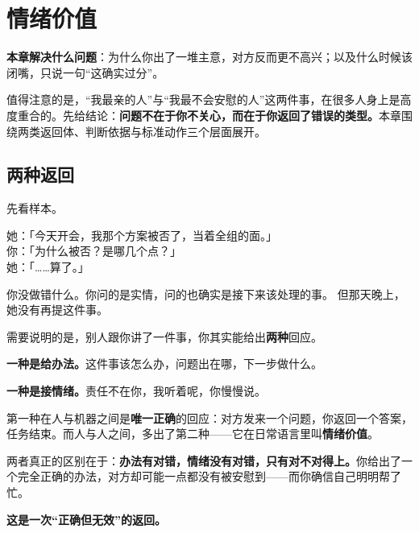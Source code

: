 \chapter{情绪价值}


\begin{guideblock}
\textbf{本章解决什么问题}：为什么你出了一堆主意，对方反而更不高兴；以及什么时候该闭嘴，只说一句“这确实过分”。
\end{guideblock}

值得注意的是，“我最亲的人”与“我最不会安慰的人”这两件事，在很多人身上是高度重合的。先给结论：\textbf{问题不在于你不关心，而在于你返回了错误的类型。}本章围绕两类返回体、判断依据与标准动作三个层面展开。

\hcirule

\section{两种返回}

先看样本。

\begin{mdquote}


她：「今天开会，我那个方案被否了，当着全组的面。」\\
你：「为什么被否？是哪几个点？」\\
她：「……算了。」

你没做错什么。你问的是实情，问的也确实是接下来该处理的事。
但那天晚上，她没有再提这件事。
\end{mdquote}

需要说明的是，别人跟你讲了一件事，你其实能给出\textbf{两种}回应。

\textbf{一种是给办法。}这件事该怎么办，问题出在哪，下一步做什么。

\textbf{一种是接情绪。}责任不在你，我听着呢，你慢慢说。

第一种在人与机器之间是\textbf{唯一正确}的回应：对方发来一个问题，你返回一个答案，任务结束。而人与人之间，多出了第二种——它在日常语言里叫\textbf{情绪价值}。

两者真正的区别在于：\textbf{办法有对错，情绪没有对错，只有对不对得上。}你给出了一个完全正确的办法，对方却可能一点都没有被安慰到——而你确信自己明明帮了忙。

\textbf{这是一次“正确但无效”的返回。}

